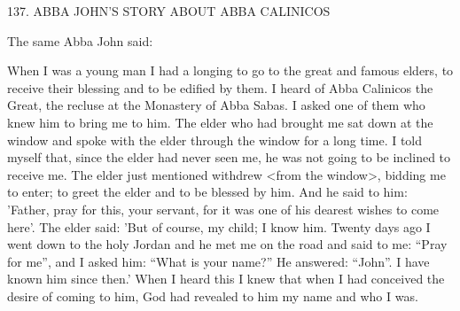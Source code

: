 137.
ABBA JOHN'S STORY ABOUT ABBA CALINICOS

The same Abba John said:

When I was a young man I had a longing to go to the great and
famous elders, to receive their blessing and to be edified by them.
I
heard of Abba Calinicos the Great, the recluse at the Monastery of
Abba Sabas.
I asked one of them who knew him to bring me to
him.
The elder who had brought me sat down at the window and
spoke with the elder through the window for a long time.
I told
myself that, since the elder had never seen me, he was not going to
be inclined to receive me.
The elder just mentioned withdrew <from
the window>, bidding me to enter; to greet the elder and to be
blessed by him.
And he said to him: 'Father, pray for this, your
servant, for it was one of his dearest wishes to come here'.
The elder
said: 'But of course, my child; I know him.
Twenty days ago I went
down to the holy Jordan and he met me on the road and said to
me: “Pray for me”, and I asked him: “What is your name?” He
answered: “John”.
I have known him since then.' When I heard this
I knew that when I had conceived the desire of coming to him, God
had revealed to him my name and who I was.

